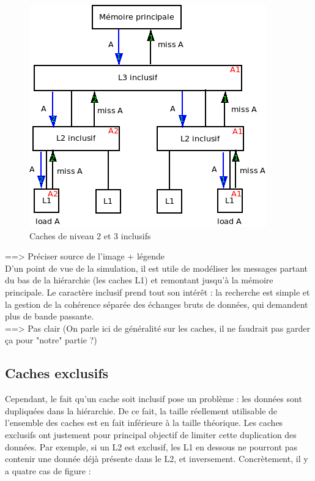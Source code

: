 \begin{figure}[!h]
\begin{center}
   \includegraphics[scale=0.7]{images/inclusifs.png}
   \caption{\label{img:inclusifs} Caches de niveau 2 et 3 inclusifs}
\end{center}
\end{figure}

==> Préciser source de l'image + légende\\

D'un point de vue de la simulation, il est utile de modéliser les messages partant du bas de la hiérarchie (les caches L1) et remontant jusqu'à la mémoire principale. Le caractère inclusif prend tout son intérêt : la recherche est simple et la gestion de la cohérence séparée des échanges bruts de données, qui demandent plus de bande passante.\\

==> Pas clair (On parle ici de généralité sur les caches, il ne faudrait pas garder ça pour "notre" partie ?)

\subsection{Caches exclusifs}
Cependant, le fait qu'un cache soit inclusif pose un problème : les données sont dupliquées dans la hiérarchie. De ce fait, la taille réellement utilisable de l'ensemble des caches est en fait inférieure à la taille théorique. Les caches exclusifs ont justement pour principal objectif de limiter cette duplication des données. Par exemple, si un L2 est exclusif, les L1 en dessous ne pourront pas contenir une donnée déjà présente dans le L2, et inversement. Concrètement, il y a quatre cas de figure : \\

